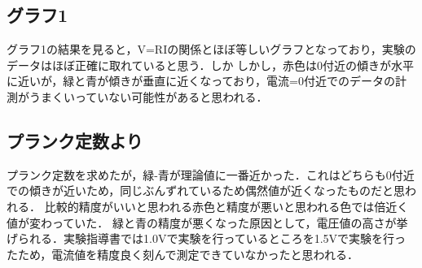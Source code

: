 \documentclass[a4paper,11pt]{ltjsarticle}
\begin{document}
\subsection{グラフ1}
グラフ1の結果を見ると，V=RIの関係とほぼ等しいグラフとなっており，実験のデータはほぼ正確に取れていると思う．しか
しかし，赤色は0付近の傾きが水平に近いが，緑と青が傾きが垂直に近くなっており，電流=0付近でのデータの計測がうまくいっていない可能性があると思われる．
\subsection{プランク定数より}
プランク定数を求めたが，緑-青が理論値に一番近かった．これはどちらも0付近での傾きが近いため，同じぶんずれているため偶然値が近くなったものだと思われる．
比較的精度がいいと思われる赤色と精度が悪いと思われる色では倍近く値が変わっていた．
緑と青の精度が悪くなった原因として，電圧値の高さが挙げられる．実験指導書では1.0Vで実験を行っているところを1.5Vで実験を行ったため，電流値を精度良く刻んで測定できていなかったと思われる．
\end{document}

